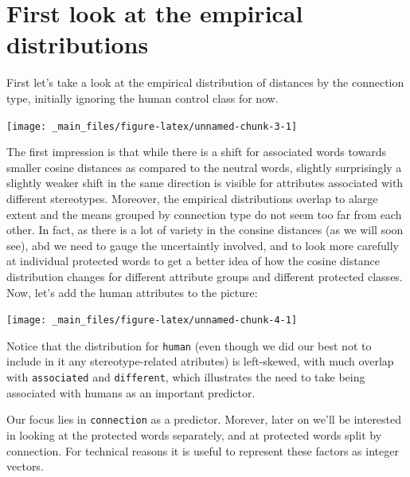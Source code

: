 \documentclass[12pt,]{book}
\begin{document}
\section{First look at the empirical
distributions}\label{first-look-at-the-empirical-distributions}

First let's take a look at the empirical distribution of distances by
the connection type, initially ignoring the human control class for now.

\vspace{1mm} \footnotesize

\begin{center}\texttt{[image: \_main\_files/figure-latex/unnamed-chunk-3-1]} \end{center}

\normalsize

The first impression is that while there is a shift for associated words
towards smaller cosine distances as compared to the neutral words,
slightly surprisingly a slightly weaker shift in the same direction is
visible for attributes associated with different stereotypes. Moreover,
the empirical distributions overlap to alarge extent and the means
grouped by connection type do not seem too far from each other. In fact,
as there is a lot of variety in the consine distances (as we will soon
see), abd we need to gauge the uncertaintly involved, and to look more
carefully at individual protected words to get a better idea of how the
cosine distance distribution changes for different attribute groups and
different protected classes. Now, let's add the human attributes to the
picture:

\vspace{1mm} \footnotesize

\begin{center}\texttt{[image: \_main\_files/figure-latex/unnamed-chunk-4-1]} \end{center}

\normalsize

\noindent Notice that the distribution for \texttt{human} (even though
we did our best not to include in it any stereotype-related atributes)
is left-skewed, with much overlap with \texttt{associated} and
\texttt{different}, which illustrates the need to take being associated
with humans as an important predictor.

Our focus lies in \texttt{connection} as a predictor. Morever, later on
we'll be interested in looking at the protected words separately, and at
protected words split by connection. For technical reasons it is useful
to represent these factors as integer vectors.
\end{document}
